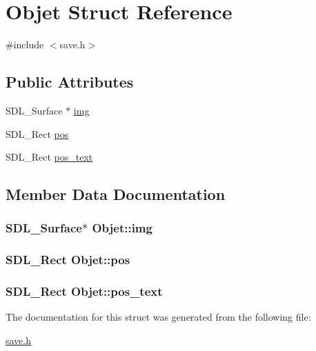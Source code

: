 \hypertarget{structObjet}{}\section{Objet Struct Reference}
\label{structObjet}


{\ttfamily \#include $<$save.\+h$>$}

\subsection*{Public Attributes}
\begin{DoxyCompactItemize}
\item 
S\+D\+L\+\_\+\+Surface $\ast$ \hyperlink{structObjet_a0dac95199f82a456854968bfe257a14e}{img}
\item 
S\+D\+L\+\_\+\+Rect \hyperlink{structObjet_aa96c8e462a0637c98ab3c192e7f1806a}{pos}
\item 
S\+D\+L\+\_\+\+Rect \hyperlink{structObjet_a22b5f8635c29778f8a669585ec6ed6fd}{pos\+\_\+text}
\end{DoxyCompactItemize}


\subsection{Member Data Documentation}
\subsubsection[{\texorpdfstring{img}{img}}]{\setlength{\rightskip}{0pt plus 5cm}S\+D\+L\+\_\+\+Surface$\ast$ Objet\+::img}\hypertarget{structObjet_a0dac95199f82a456854968bfe257a14e}{}\label{structObjet_a0dac95199f82a456854968bfe257a14e}
\subsubsection[{\texorpdfstring{pos}{pos}}]{\setlength{\rightskip}{0pt plus 5cm}S\+D\+L\+\_\+\+Rect Objet\+::pos}\hypertarget{structObjet_aa96c8e462a0637c98ab3c192e7f1806a}{}\label{structObjet_aa96c8e462a0637c98ab3c192e7f1806a}
\subsubsection[{\texorpdfstring{pos\+\_\+text}{pos_text}}]{\setlength{\rightskip}{0pt plus 5cm}S\+D\+L\+\_\+\+Rect Objet\+::pos\+\_\+text}\hypertarget{structObjet_a22b5f8635c29778f8a669585ec6ed6fd}{}\label{structObjet_a22b5f8635c29778f8a669585ec6ed6fd}


The documentation for this struct was generated from the following file\+:\begin{DoxyCompactItemize}
\item 
\hyperlink{save_8h}{save.\+h}\end{DoxyCompactItemize}
